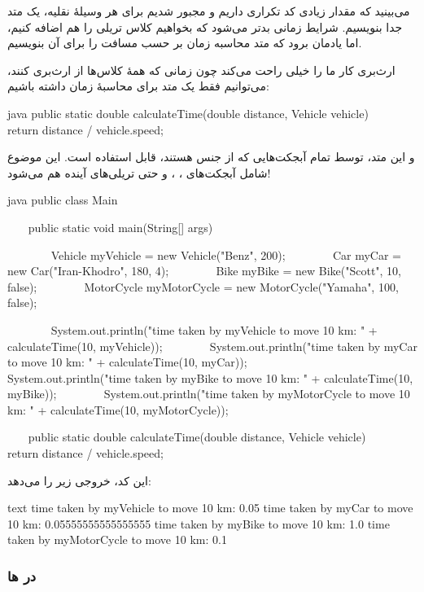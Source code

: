 می‌بینید که مقدار زیادی کد تکراری داریم و مجبور شدیم برای هر وسیلهٔ نقلیه،
یک متد جدا بنویسیم. شرایط زمانی بدتر می‌شود که بخواهیم کلاس تریلی را هم
اضافه کنیم، اما یادمان برود که متد محاسبه زمان بر حسب مسافت را برای آن
بنویسیم.

ارث‌بری کار ما را خیلی راحت می‌کند چون زمانی که همهٔ کلاس‌ها از
 ارث‌بری کنند، می‌توانیم فقط یک متد برای محاسبهٔ زمان
داشته باشیم:

\begin{codebox}{java}
public static double calculateTime(double distance, Vehicle vehicle) {
    return distance / vehicle.speed;  
}
\end{codebox}

و این متد، توسط تمام آبجکت‌هایی که از جنس  هستند،
قابل استفاده‌ است. این موضوع شامل آبجکت‌های  ،
 ،  و حتی تریلی‌های آینده هم
می‌شود!

\begin{codebox}{java}
public class Main {
    public static void main(String[] args) {  
        Vehicle myVehicle = new Vehicle("Benz", 200);  
        Car myCar = new Car("Iran-Khodro", 180, 4);  
        Bike myBike = new Bike("Scott", 10, false);  
        MotorCycle myMotorCycle = new MotorCycle("Yamaha", 100, false);  
  
        System.out.println("time taken by myVehicle to move 10 km: " + calculateTime(10, myVehicle));  
        System.out.println("time taken by myCar to move 10 km: " + calculateTime(10, myCar));  
        System.out.println("time taken by myBike to move 10 km: " + calculateTime(10, myBike));  
        System.out.println("time taken by myMotorCycle to move 10 km: " + calculateTime(10, myMotorCycle));  
    }

    public static double calculateTime(double distance, Vehicle vehicle) {
        return distance / vehicle.speed;  
    }  
}
\end{codebox}

این کد، خروجی زیر را می‌دهد:

\begin{codebox}{text}
time taken by myVehicle to move 10 km: 0.05  
time taken by myCar to move 10 km: 0.05555555555555555  
time taken by myBike to move 10 km: 1.0  
time taken by myMotorCycle to move 10 km: 0.1
\end{codebox}

\subsubsection{ در  ها}

